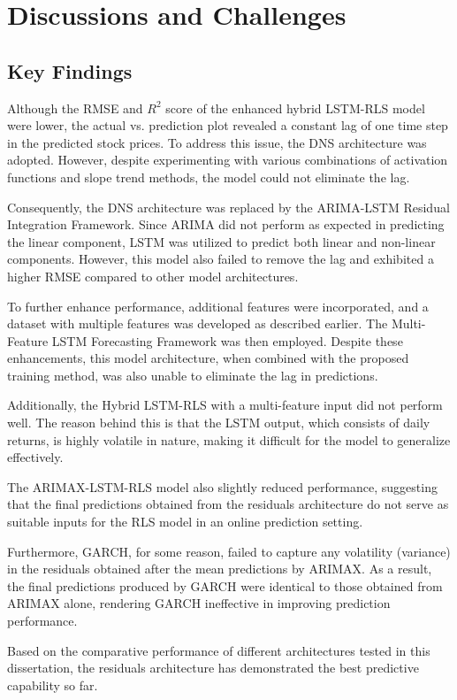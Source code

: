 \chapter{Discussions and Challenges}

\section{Key Findings}
Although the RMSE and \( R^2 \) score of the enhanced hybrid LSTM-RLS model were lower, the actual vs. prediction plot revealed a constant lag of one time step in the predicted stock prices. To address this issue, the DNS architecture was adopted. However, despite experimenting with various combinations of activation functions and slope trend methods, the model could not eliminate the lag.

Consequently, the DNS architecture was replaced by the ARIMA-LSTM Residual Integration Framework. Since ARIMA did not perform as expected in predicting the linear component, LSTM was utilized to predict both linear and non-linear components. However, this model also failed to remove the lag and exhibited a higher RMSE compared to other model architectures.

To further enhance performance, additional features were incorporated, and a dataset with multiple features was developed as described earlier. The Multi-Feature LSTM Forecasting Framework was then employed. Despite these enhancements, this model architecture, when combined with the proposed training method, was also unable to eliminate the lag in predictions.

Additionally, the Hybrid LSTM-RLS with a multi-feature input did not perform well. The reason behind this is that the LSTM output, which consists of daily returns, is highly volatile in nature, making it difficult for the model to generalize effectively.

The ARIMAX-LSTM-RLS model also slightly reduced performance, suggesting that the final predictions obtained from the residuals architecture do not serve as suitable inputs for the RLS model in an online prediction setting.

Furthermore, GARCH, for some reason, failed to capture any volatility (variance) in the residuals obtained after the mean predictions by ARIMAX. As a result, the final predictions produced by GARCH were identical to those obtained from ARIMAX alone, rendering GARCH ineffective in improving prediction performance.

Based on the comparative performance of different architectures tested in this dissertation, the residuals architecture has demonstrated the best predictive capability so far.

